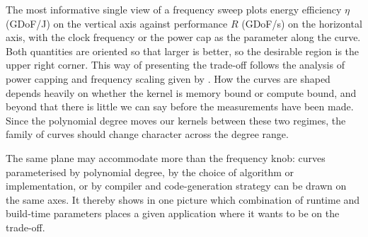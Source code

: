 The most informative single view of a frequency sweep plots energy efficiency $\eta$ (GDoF/J) on the vertical axis against performance $R$ (GDoF/s) on the horizontal axis, with the clock frequency or the power cap as the parameter along the curve.
Both quantities are oriented so that larger is better, so the desirable region is the upper right corner.
This way of presenting the trade-off follows the analysis of power capping and frequency scaling given by \cite{hager_wccm2026}.
%
How the curves are shaped depends heavily on whether the kernel is memory bound or compute bound, and beyond that there is little we can say before the measurements have been made.
Since the polynomial degree moves our kernels between these two regimes, the family of curves should change character across the degree range.

The same plane may accommodate more than the frequency knob: curves parameterised by polynomial degree, by the choice of algorithm or implementation, or by compiler and code-generation strategy can be drawn on the same axes.
It thereby shows in one picture which combination of runtime and build-time parameters places a given application where it wants to be on the trade-off.

